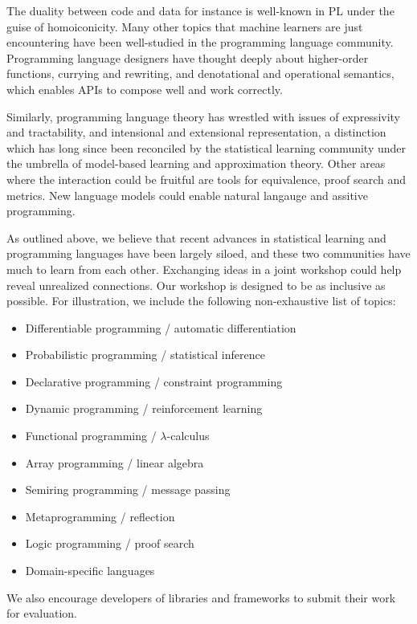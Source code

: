 \documentclass{article}
\begin{document}
    The duality between code and data for instance is well-known in PL under the guise of homoiconicity. Many other topics that machine learners are just encountering have been well-studied in the programming language community. Programming language designers have thought deeply about higher-order functions, currying and rewriting, and denotational and operational semantics, which enables APIs to compose well and work correctly.

    Similarly, programming language theory has wrestled with issues of expressivity and tractability, and intensional and extensional representation, a distinction which has long since been reconciled by the statistical learning community under the umbrella of model-based learning and approximation theory. Other areas where the interaction could be fruitful are tools for equivalence, proof search and metrics. New language models could enable natural langauge and assitive programming.

    As outlined above, we believe that recent advances in statistical learning and programming languages have been largely siloed, and these two communities have much to learn from each other. Exchanging ideas in a joint workshop could help reveal unrealized connections. Our workshop is designed to be as inclusive as possible. For illustration, we include the following non-exhaustive list of topics:

    \begin{itemize}
      \item Differentiable programming / automatic differentiation
      \item Probabilistic programming / statistical inference
      \item Declarative programming / constraint programming
      \item Dynamic programming / reinforcement learning
      \item Functional programming / $\lambda$-calculus
      \item Array programming / linear algebra
      \item Semiring programming / message passing
      \item Metaprogramming / reflection
      \item Logic programming / proof search
      \item Domain-specific languages
    \end{itemize}

    We also encourage developers of libraries and frameworks to submit their work for evaluation.
\end{document}
